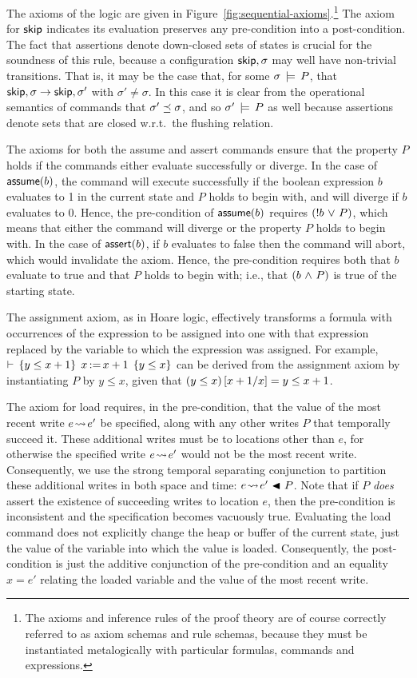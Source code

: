 \documentclass[11pt]{report}         %
\begin{document}
The axioms of the logic are given in Figure~\ref{fig:sequential-axioms}.\footnote{The axioms and inference rules of the proof theory are of course correctly referred to as axiom schemas and rule schemas, because they must be instantiated metalogically with particular formulas, commands and expressions.} The axiom for $\operatorname{\mathsf{skip}}$ indicates its evaluation preserves any pre-condition into a post-condition. The fact that assertions denote down-closed sets of states is crucial for the soundness of this rule, because a configuration $\operatorname{\mathsf{skip}},\sigma$ may well have non-trivial transitions. That is, it may be the case that, for some $\sigma \,\models\, P$, that $\operatorname{\mathsf{skip}},\sigma \rightarrow \operatorname{\mathsf{skip}},\sigma'$ with $\sigma' \neq \sigma$. In this case it is clear from the operational semantics of commands that $\sigma' \preceq \sigma$, and so $\sigma' \,\models\, P$ as well because assertions denote sets that are closed w.r.t.\ the flushing relation. 

The axioms for both the assume and assert commands ensure that the property $P$ holds if the commands either evaluate successfully or diverge. In the case of $\operatorname{\mathsf{assume}}(b)$, the command will execute successfully if the boolean expression $b$ evaluates to 1 in the current state and $P$ holds to begin with, and will diverge if $b$ evaluates to 0. Hence, the pre-condition of $\operatorname{\mathsf{assume}}(b)$ requires $(!b \operatorname{\,\vee\,} P)$, which means that either the command will diverge or the property $P$ holds to begin with. In the case of $\operatorname{\mathsf{assert}}(b)$, if $b$ evaluates to false then the command will abort, which would invalidate the axiom. Hence, the pre-condition requires both that $b$ evaluate to true and that $P$ holds to begin with; i.e., that $(b \operatorname{\,\wedge\,} P)$ is true of the starting state. 

The assignment axiom, as in Hoare logic, effectively transforms a formula with occurrences of the expression to be assigned into one with that expression replaced by the variable to which the expression was assigned. For example, $\vdash\,\left\lbrace y \leq x+1 \right\rbrace\;x \operatorname{:\!=} x+1\;\left\lbrace y \leq x \right\rbrace$ can be derived from the assignment axiom by instantiating $P$ by $y \leq x$, given that $(y \leq x)\left[x+1 / x\right] = y \leq x+1$. 

The axiom for load requires, in the pre-condition, that the value of the most recent write $e \!\leadsto\! e'$ be specified, along with any other writes $P$ that temporally succeed it. These additional writes must be to locations other than $e$, for otherwise the specified write $e \!\leadsto\! e'$ would not be the most recent write. Consequently, we use the strong temporal separating conjunction to partition these additional writes in both space and time: $e \!\leadsto\! e' \operatorname{\,\blacktriangleleft\,} P$. Note that if $P$ \emph{does} assert the existence of succeeding writes to location $e$, then the pre-condition is inconsistent and the specification becomes vacuously true. Evaluating the load command does not explicitly change the heap or buffer of the current state, just the value of the variable into which the value is loaded. Consequently, the post-condition is just the additive conjunction of the pre-condition and an equality $x = e'$ relating the loaded variable and the value of the most recent write. 
\end{document}
